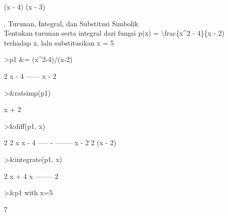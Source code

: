 \documentclass{article}
\newenvironment{eulernotebook}{\par}{\par}
\newenvironment{eulercomment}{\par\medskip}{\par\medskip}
\begin{document}
\begin{eulernotebook}
\begin{euleroutput}
                             (x - 4) (x - 3)
  
\end{euleroutput}
\begin{eulercomment}
6. Turunan, Integral, dan Substitusi Simbolik\\
Tentukan turunan serta integral dari fungsi p(x) = \textbackslash{}frac\{x\textasciicircum{}2 - 4\}\{x -
2) terhadap x, lalu substitusikan x = 5
\end{eulercomment}
\begin{eulerprompt}
>p1 &= (x^2-4)/(x-2)
\end{eulerprompt}
\begin{euleroutput}
  
                                   2
                                  x  - 4
                                  ------
                                  x - 2
  
\end{euleroutput}
\begin{eulerprompt}
>&ratsimp(p1)
\end{eulerprompt}
\begin{euleroutput}
  
                                  x + 2
  
\end{euleroutput}
\begin{eulerprompt}
>&diff(p1, x)
\end{eulerprompt}
\begin{euleroutput}
  
                                       2
                              2 x     x  - 4
                             ----- - --------
                             x - 2          2
                                     (x - 2)
  
\end{euleroutput}
\begin{eulerprompt}
>&integrate(p1, x)
\end{eulerprompt}
\begin{euleroutput}
  
                                  2
                                 x  + 4 x
                                 --------
                                    2
  
\end{euleroutput}
\begin{eulerprompt}
>&p1 with x=5
\end{eulerprompt}
\begin{euleroutput}
  
                                    7
  
\end{euleroutput}
\end{eulernotebook}
\end{document}
